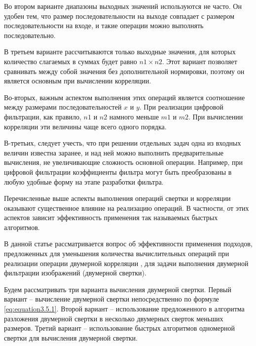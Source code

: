 Во втором варианте диапазоны выходных значений используются не часто. Он удобен тем, что размер последовательности на выходе совпадает с размером последовательности на входе, и такие операции можно выполнять
последовательно.

В третьем варианте рассчитываются только выходные значения, для которых количество слагаемых в суммах будет равно $n1 \times n2$. Этот вариант позволяет сравнивать между собой значения без дополнительной нормировки, поэтому он является основным при вычислении корреляции.

Во-вторых, важным аспектом выполнения этих операций является соотношение между размерами последовательностей $x$ и $y$. При реализации цифровой фильтрации, как правило, $n1$ и $n2$ намного меньше $m1$ и $m2$. При вычислении корреляции эти величины чаще всего одного порядка.

В-третьих, следует учесть, что при решении отдельных задач одна из входных величин известна заранее, и над ней можно выполнить предварительные вычисления, не увеличивающие сложность основной операции.
Например, при цифровой фильтрации коэффициенты фильтра могут быть преобразованы в любую удобные форму на этапе разработки фильтра.

Перечисленные выше аспекты выполнения операций свертки и корреляции оказывают существенное влияние на реализацию операций. В частности, от этих аспектов зависит эффективность применения так называемых быстрых алгоритмов. 

В данной статье \cite{decomposition_method_application2017} рассматривается вопрос об эффективности применения подходов, предложенных для уменьшения количества вычислительных операций при реализации операции двумерной корреляции \cite{550562, altman2015fast}, для задачи выполнения двумерной фильтрации изображений (двумерной свертки).


Будем рассматривать три варианта вычисления двумерной свертки. Первый вариант – вычисление двумерной свертки непосредственно по формуле \ref{eq:equation3.5.1}. Второй вариант – использование предложенного в \cite{550562} алгоритма разложения двумерной свертки в несколько двумерных сверток меньших размеров. Третий вариант – использование быстрых алгоритмов одномерной свертки \cite{MOU1987377} для вычисления двумерной свертки.

